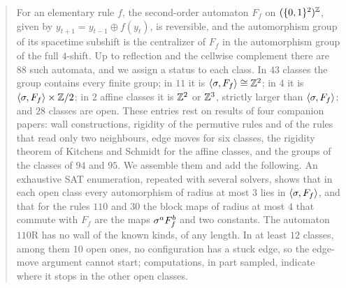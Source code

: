 \begin{abstract}
For an elementary rule $f$, the second-order automaton $F_f$ on $(\{0,1\}^2)^{\Z}$, given by $y_{t+1}=y_{t-1}\oplus f(y_t)$, is reversible, and the automorphism group of its spacetime subshift is the centralizer of $F_f$ in the automorphism group of the full $4$-shift. Up to reflection and the cellwise complement there are $88$ such automata, and we assign a status to each class. In $43$ classes the group contains every finite group; in $11$ it is $\langle\sh,F_f\rangle\cong\Z^2$; in $4$ it is $\langle\sh,F_f\rangle\times\Z/2$; in $2$ affine classes it is $\Z^2$ or $\Z^3$, strictly larger than $\langle\sh,F_f\rangle$; and $28$ classes are open. These entries rest on results of four companion papers: wall constructions, rigidity of the permutive rules and of the rules that read only two neighbours, edge moves for six classes, the rigidity theorem of Kitchens and Schmidt for the affine classes, and the groups of the classes of $94$ and $95$. We assemble them and add the following. An exhaustive SAT enumeration, repeated with several solvers, shows that in each open class every automorphism of radius at most $3$ lies in $\langle\sh,F_f\rangle$, and that for the rules $110$ and $30$ the block maps of radius at most $4$ that commute with $F_f$ are the maps $\sh^aF_f^b$ and two constants. The automaton $110$R has no wall of the known kinds, of any length. In at least $12$ classes, among them $10$ open ones, no configuration has a stuck edge, so the edge-move argument cannot start; computations, in part sampled, indicate where it stops in the other open classes.
\end{abstract}
